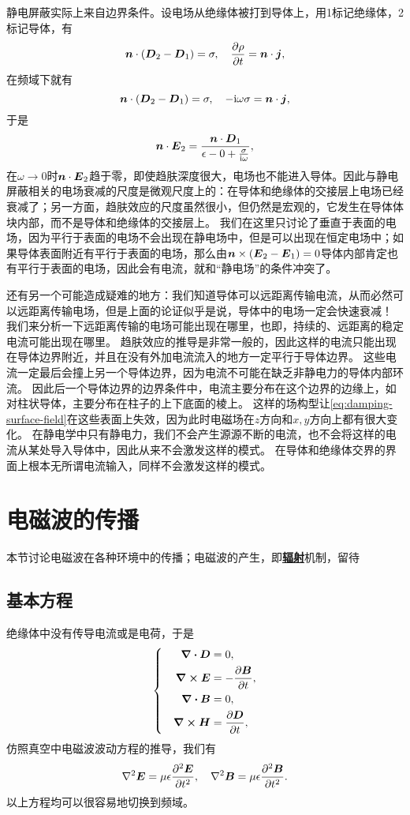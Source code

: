 \documentclass[UTF8, a4paper]{ctexart}
\newcommand*{\ii}{\mathrm{i}}
\newcommand*{\concept}[1]{\underline{\textbf{#1}}}
\newenvironment{bigcase}{\left\{\quad\begin{aligned}}{\end{aligned}\right.}
\begin{document}
静电屏蔽实际上来自边界条件。设电场从绝缘体被打到导体上，用1标记绝缘体，2标记导体，有
\[
    \vb*{n} \cdot (\vb*{D}_2 - \vb*{D}_1) = \sigma, \quad \pdv{\rho}{t} = \vb*{n} \cdot \vb*{j},
\]
在频域下就有
\[
    \vb*{n} \cdot (\vb*{D}_2 - \vb*{D}_1) = \sigma, \quad - \ii \omega \sigma = \vb*{n} \cdot \vb*{j},
\]
于是
\[
    \vb*{n} \cdot \vb*{E}_2 = \frac{\vb*{n} \cdot \vb*{D}_1}{\epsilon-0 + \frac{\sigma}{\ii \omega}},
\]
在$\omega \to 0$时$\vb*{n} \cdot \vb*{E}_2$趋于零，即使趋肤深度很大，电场也不能进入导体。因此与静电屏蔽相关的电场衰减的尺度是微观尺度上的：在导体和绝缘体的交接层上电场已经衰减了；另一方面，趋肤效应的尺度虽然很小，但仍然是宏观的，它发生在导体体块内部，而不是导体和绝缘体的交接层上。
我们在这里只讨论了垂直于表面的电场，因为平行于表面的电场不会出现在静电场中，但是可以出现在恒定电场中；如果导体表面附近有平行于表面的电场，那么由$\vb*{n} \times (\vb*{E}_2 - \vb*{E}_1)=0$导体内部肯定也有平行于表面的电场，因此会有电流，就和“静电场”的条件冲突了。

还有另一个可能造成疑难的地方：我们知道导体可以远距离传输电流，从而必然可以远距离传输电场，但是上面的论证似乎是说，导体中的电场一定会快速衰减！
我们来分析一下远距离传输的电场可能出现在哪里，也即，持续的、远距离的稳定电流可能出现在哪里。
趋肤效应的推导是非常一般的，因此这样的电流只能出现在导体边界附近，并且在没有外加电流流入的地方一定平行于导体边界。
这些电流一定最后会撞上另一个导体边界，因为电流不可能在缺乏非静电力的导体内部环流。
因此后一个导体边界的边界条件中，电流主要分布在这个边界的边缘上，如对柱状导体，主要分布在柱子的上下底面的棱上。
这样的场构型让\eqref{eq:damping-surface-field}在这些表面上失效，因为此时电磁场在$z$方向和$x, y$方向上都有很大变化。
在静电学中只有静电力，我们不会产生源源不断的电流，也不会将这样的电流从某处导入导体中，因此从来不会激发这样的模式。
在导体和绝缘体交界的界面上根本无所谓电流输入，同样不会激发这样的模式。

\section{电磁波的传播}

本节讨论电磁波在各种环境中的传播；电磁波的产生，即\concept{辐射}机制，留待 %

\subsection{基本方程}

绝缘体中没有传导电流或是电荷，于是
\begin{equation}
    \begin{bigcase}
        \div{\vb*{D}} &= 0, \\
        \curl{\vb*{E}} &= - \pdv{\vb*{B}}{t}, \\
        \div{\vb*{B}} &= 0, \\
        \curl{\vb*{H}} &= \pdv{\vb*{D}}{t},
    \end{bigcase}
\end{equation}
仿照真空中电磁波波动方程的推导，我们有
\begin{equation}
    \laplacian{\vb*{E}} = \mu \epsilon \pdv[2]{\vb*{E}}{t}, \quad \laplacian{\vb*{B}} = \mu \epsilon \pdv[2]{\vb*{B}}{t}.
\end{equation}
以上方程均可以很容易地切换到频域。
\end{document}
